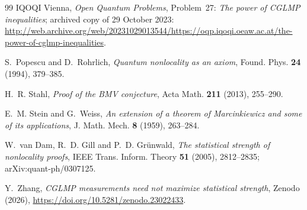 \documentclass[11pt]{article}
\theoremstyle{remark}
\numberwithin{equation}{section}
\begin{document}
\begin{thebibliography}{99}
IQOQI Vienna, \emph{Open Quantum Problems}, Problem~27: \emph{The power of CGLMP inequalities}; archived copy of 29
October 2023:
\url{http://web.archive.org/web/20231029013544/https://oqp.iqoqi.oeaw.ac.at/the-power-of-cglmp-inequalities}.

S.~Popescu and D.~Rohrlich, \emph{Quantum nonlocality as an axiom}, Found. Phys. \textbf{24} (1994), 379--385.

H.~R. Stahl, \emph{Proof of the BMV conjecture}, Acta Math. \textbf{211} (2013), 255--290.

E.~M. Stein and G.~Weiss, \emph{An extension of a theorem of Marcinkiewicz and some of its applications}, J. Math.
Mech. \textbf{8} (1959), 263--284.

W.~van Dam, R.~D. Gill and P.~D. Gr\"unwald, \emph{The statistical strength of nonlocality proofs}, IEEE Trans. Inform.
Theory \textbf{51} (2005), 2812--2835; arXiv:quant-ph/0307125.

Y.~Zhang, \emph{CGLMP measurements need not maximize statistical strength}, Zenodo (2026),
\url{https://doi.org/10.5281/zenodo.23022433}.

\end{thebibliography}
\end{document}
